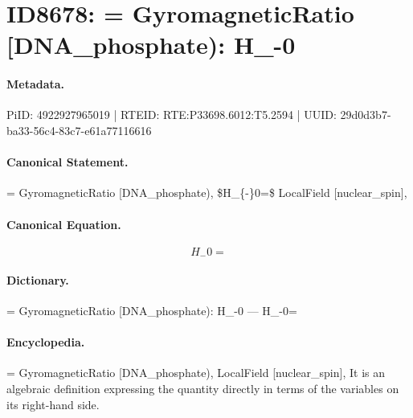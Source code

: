 \section*{ID8678: = GyromagneticRatio [DNA\_phosphate): H\_-0}
\paragraph{Metadata.}
PiID: 4922927965019 | RTEID: RTE:P33698.6012:T5.2594 | UUID: 29d0d3b7-ba33-56c4-83c7-e61a77116616

\paragraph{Canonical Statement.}
= GyromagneticRatio [DNA\_phosphate), \$H\_\{-\}0=\$ LocalField [nuclear\_spin],

\paragraph{Canonical Equation.}
\[
H_{-}0=
\]

\paragraph{Dictionary.}
= GyromagneticRatio [DNA\_phosphate): H\_-0 — H\_-0=

\paragraph{Encyclopedia.}
= GyromagneticRatio [DNA\_phosphate), LocalField [nuclear\_spin], It is an algebraic definition expressing the quantity directly in terms of the variables on its right-hand side.
